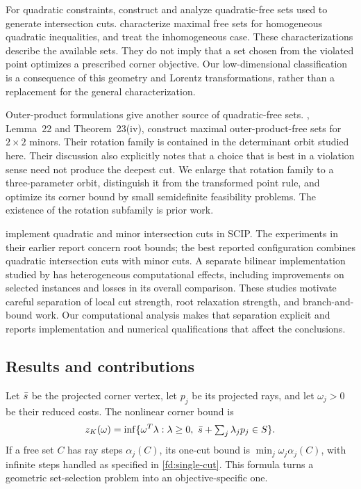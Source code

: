For quadratic constraints, \citet{MPS2022} construct and analyze
quadratic-free sets used to generate intersection cuts.
\citet{MPS2025} characterize maximal free sets for homogeneous quadratic
inequalities, and \citet{MPS2026} treat the inhomogeneous case.
These characterizations describe the available sets. They do not imply
that a set chosen from the violated point optimizes a prescribed corner
objective. Our low-dimensional classification is a consequence of this
geometry and Lorentz transformations, rather than a replacement for the
general characterization.

Outer-product formulations give another source of quadratic-free sets.
\citet{BCM2020}, Lemma~22 and Theorem~23(iv), construct maximal
outer-product-free sets for $2\times2$ minors. Their rotation family is
contained in the determinant orbit studied here. Their discussion also
explicitly notes that a choice that is best in a violation sense need not
produce the deepest cut. We enlarge that rotation family to a
three-parameter orbit, distinguish it from the transformed point rule,
and optimize its corner bound by small semidefinite feasibility problems.
The existence of the rotation subfamily is prior work.

\citet{CMS2023} implement quadratic and minor intersection cuts in SCIP.
The experiments in their earlier report \citep{ChmielaMunozSerrano2020ZIB}
concern root bounds; the best reported configuration combines quadratic
intersection cuts with minor cuts. A separate bilinear implementation studied by
\citet{FischettiMonaci2020} has heterogeneous computational effects,
including improvements on selected instances and losses in its overall
comparison. These studies motivate careful separation of local cut
strength, root relaxation strength, and branch-and-bound work. Our
computational analysis makes that separation explicit and reports
implementation and numerical qualifications that affect the conclusions.

\subsection{Results and contributions}

Let $\bar s$ be the projected corner vertex, let $p_j$ be its projected
rays, and let $\omega_j>0$ be their reduced costs. The nonlinear corner
bound is
\[
 z_K(\omega)=\inf\{\omega^T\lambda:
       \lambda\ge0,\ \bar s+\textstyle\sum_j\lambda_jp_j\in S\}.
\]
If a free set $C$ has ray steps $\alpha_j(C)$, its one-cut bound is
$\min_j\omega_j\alpha_j(C)$, with infinite steps handled as specified in
\cref{fd:single-cut}. This formula turns a geometric set-selection
problem into an objective-specific one.


